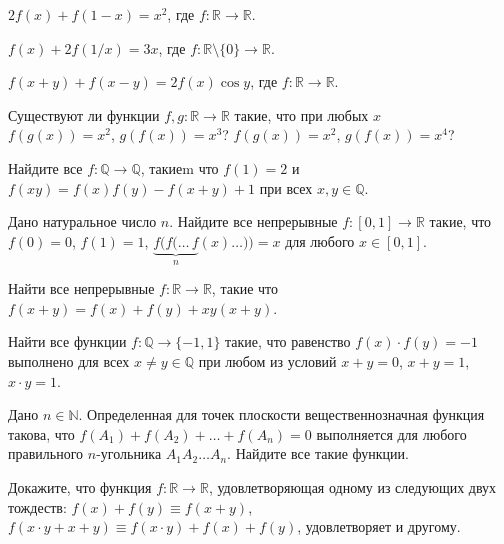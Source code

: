 \begin{problems}

\item
$2f(x) + f(1-x) = x^2$, где
$f \colon \mathbb{R} \to \mathbb{R}$.

\item
$f(x) + 2f(1/x) = 3x$, где
$f \colon \mathbb{R} \setminus \{0\} \to \mathbb{R}$.

\item
$f(x + y) + f(x - y) = 2f(x)\cos y$, где
$f \colon \mathbb{R} \to \mathbb{R}$.

\item
Существуют ли функции
$f, g \colon \mathbb{R} \to \mathbb{R}$
такие, что при любых $x$
\\
\sp
$f(g(x)) = x^2$, $g(f(x)) = x^3$?
\quad\sp
$f(g(x)) = x^2$, $g(f(x)) = x^4$?

\item
Найдите все
$f \colon \mathbb{Q} \to \mathbb{Q}$,
такиеm что
$f(1) = 2$ и
$f(x y) = f(x) f(y) - f(x + y) + 1$
при всех $x, y \in \mathbb{Q}$.

\item
Дано натуральное число $n$.
Найдите все непрерывные $f \colon [0, 1] \to \mathbb{R}$ такие, что
$f(0) = 0$, $f(1) = 1$,
\(
    \underbrace{
        f(f(\ldots\,f
    }_{n}
    (x)\ldots))
=
    x
\)
для любого $x \in [0,1]$.

\item
Найти все непрерывные $f \colon \mathbb{R} \to \mathbb{R}$, такие что
\(
    f(x + y)
=
    f(x) + f(y) + x y (x + y)
\).

\item
Найти все функции $f \colon \mathbb{Q} \to \{-1, 1\}$ такие, что равенство
$f(x) \cdot f(y) = -1$
выполнено для всех $x \neq y \in \mathbb{Q}$ при любом из условий
$x + y = 0$, $x + y = 1$, $x \cdot y = 1$.

\item
Дано $n \in \mathbb{N}$.
Определенная для точек плоскости вещественнозначная функция такова, что
$f(A_1) + f(A_2) + \ldots + f(A_n) = 0$ выполняется для любого правильного
$n$-угольника $A_1 A_2 \ldots A_n$.
Найдите все такие функции.

\itemx{*}
Докажите, что функция $f \colon \mathbb{R} \to \mathbb{R}$, удовлетворяющая одному из
следующих двух тождеств:
\(
    f(x) + f(y)
\equiv
    f(x + y)
\),
\(
    f(x \cdot y + x + y)
\equiv
    f(x \cdot y) + f(x) + f(y)
\),
удовлетворяет и другому.

\end{problems}

